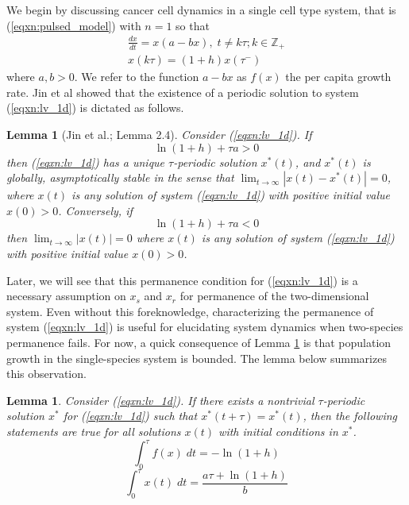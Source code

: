 \documentclass{article}
\newtheorem{lemma}[theorem]{Lemma}
\theoremstyle{definition}
\newcommand{\Z}{{\mathbb{Z}}}
\begin{document}
We begin by discussing cancer cell dynamics in a single cell type system, that is (\ref{eqxn:pulsed_model}) with $n=1$ so that
    \begin{equation}\label{eqxn:lv_1d}
    \begin{split}
        \frac{dx}{dt} = x(a - b x), \; t \neq k\tau; k \in \Z_+ \\
        x(k\tau) = (1+h)x(\tau^-)
    \end{split}
    \end{equation}
where $a, b > 0$. We refer to the function $a -bx$ as $f(x)$ the per capita growth rate. Jin et al \cite{jin_persistence_2005} showed that the existence of a periodic solution to system (\ref{eqxn:lv_1d}) is dictated as follows.

\begin{lemma}[Jin et al.; Lemma 2.4]\label{lemma:jin_1d_periodic_soln}
    Consider (\ref{eqxn:lv_1d}). If
    \begin{equation*}
        \ln{(1+h) + \tau a > 0}
    \end{equation*}
    then (\ref{eqxn:lv_1d}) has a unique $\tau$-periodic solution $x^*(t)$, and $x^*(t)$ is globally, asymptotically stable in the sense that $\lim_{t \to \infty}|x(t) - x^*(t)| = 0$, where $x(t)$ is any solution of system (\ref{eqxn:lv_1d}) with positive initial value $x(0) > 0$. Conversely, if
    \begin{equation*}
        \ln{(1+h) + \tau a < 0}
    \end{equation*}
    then $\lim_{t \to \infty}|x(t)| = 0$ where $x(t)$ is any solution of system (\ref{eqxn:lv_1d}) with positive initial value $x(0) > 0$.
\end{lemma}

Later, we will see that this permanence condition for (\ref{eqxn:lv_1d}) is a necessary assumption on $x_s$ and $x_r$ for permanence of the two-dimensional system. Even without this foreknowledge, characterizing the permanence of system (\ref{eqxn:lv_1d}) is useful for elucidating system dynamics when two-species permanence fails. For now, a quick consequence of Lemma \ref{lemma:jin_1d_periodic_soln} is that population growth in the single-species system is bounded. The lemma below summarizes this observation.

\begin{lemma}\label{lemma:periodic_integral_of_lv_1d}
    Consider (\ref{eqxn:lv_1d}). If there exists a nontrivial $\tau$-periodic solution $x^*$ for (\ref{eqxn:lv_1d}) such that $x^*(t + \tau) = x^*(t)$, then the following statements are true for all solutions $x(t)$ with initial conditions in $x^*$.
    \begin{equation}\label{eqxn:periodic_integral_of_f}
        \int_0^\tau f(x) \; dt = -\ln{(1 + h)}
    \end{equation}
    \begin{equation}\label{eqxn:periodic_integral_of_x}
        \int_0^\tau x(t) \; dt = \frac{a\tau  + \ln{(1+h)}}{b} 
    \end{equation}
           
\end{lemma}
\end{document}
